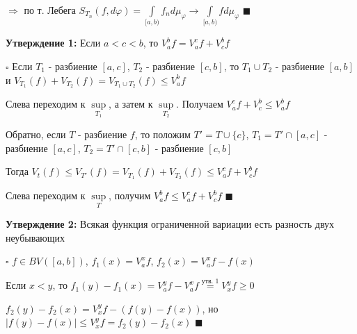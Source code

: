\documentclass[a4paper]{report}
\begin{document}
$\Rightarrow$ по т. Лебега $S_{T_n}(f,d\varphi)=\displaystyle\int\limits_{[a,b)}f_n d\mu_\varphi\to\displaystyle\int\limits_{[a,b)}f d\mu_\varphi$ $\blacksquare$
\bigskip

\noindent\textbf{Утверждение 1:} Если $a<c<b$, то $V_a^b f=V_a^c f+V_c^b f$

\noindent $\square$ Если $T_1$ - разбиение $[a,c]$, $T_2$ - разбиение $[c,b]$, то $T_1\cup T_2$ - разбиение $[a,b]$ и $V_{T_1}(f)+V_{T_2}(f)=V_{T_1\cup T_2}(f)\le V_a^b f$

Слева переходим к $\sup\limits_{T_1}$, а затем к $\sup\limits_{T_2}$. Получаем $V_a^c f+V_c^b\le V_a^b f$

Обратно, если $T$ - разбиение $f$, то положим $T'=T\cup\{c\}$, $T_1=T'\cap[a,c]$ - разбиение $[a,c]$, $T_2=T'\cap[c,b]$ - разбиение $[c,b]$

Тогда $V_t(f)\le V_{T'}(f)=V_{T_1}(f)+V_{T_2}(f)\le V_a^c f+V_c^b f$

Слева переходим к $\sup\limits_T$, получим $V_a^b f\le V_a^c f+V_c^b f$ $\blacksquare$
\bigskip

\noindent\textbf{Утверждение 2:} Всякая функция ограниченной вариации есть разность двух неубывающих 

\noindent $\square$ $f\in BV([a,b])$, $f_1(x)=V_a^x f$, $f_2(x)=V_a^x f-f(x)$

Если $x<y$, то $f_1(y)-f_1(x)=V_a^y f-V_a^x f\stackrel{\text{утв. 1}}{=}V_x^y f\ge0$

\noindent$f_2(y)-f_2(x)=V_x^y f-(f(y)-f(x))$, но $|f(y)-f(x)|\le V_x^y f=f_2(y)-f_2(x)$ $\blacksquare$
\end{document}
